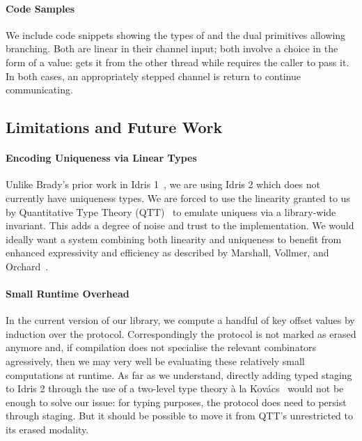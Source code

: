 \documentclass{easychair}
\begin{document}
\paragraph{Code Samples} We include code snippets showing the
types of  and 
the dual primitives allowing branching.
%
Both are linear in their channel input; both involve a choice in the
form of a  value:  gets it from
the other thread while  requires the caller to
pass it. In both cases, an appropriately stepped channel is return to
continue communicating.
%

\subsection*{Limitations and Future Work}

\paragraph{Encoding Uniqueness via Linear Types}
Unlike Brady's prior work in Idris 1~\cite{DBLP:journals/aghcs/Brady17},
we are using Idris 2 which does not currently have uniqueness types.
We are forced to use the linearity granted to us by
Quantitative Type Theory (QTT)~\cite{DBLP:conf/birthday/McBride16,DBLP:conf/lics/Atkey18}
to emulate uniquess via a library-wide invariant.
%
This adds a degree of noise and trust to the implementation.
We would ideally want a system combining both linearity and uniqueness
to benefit from enhanced expressivity and efficiency as described
by Marshall, Vollmer, and Orchard~\cite{DBLP:conf/esop/MarshallVO22}.

\paragraph{Small Runtime Overhead}
In the current version of our library, we compute a handful
of key offset values by induction over the protocol. Correspondingly
the protocol is not marked as erased anymore and, if compilation does
not specialise the relevant combinators agressively, then we may very
well be evaluating these relatively small computations at runtime.
%
As far as we understand, directly adding typed staging to Idris 2
through the use of a two-level type theory à la
Kov{\'{a}}cs~\cite{DBLP:journals/pacmpl/Kovacs22} would not be
enough to solve our issue: for typing purposes, the protocol does need
to persist through staging. But it should be possible to move it
from QTT's unrestricted to its erased modality.
\end{document}
